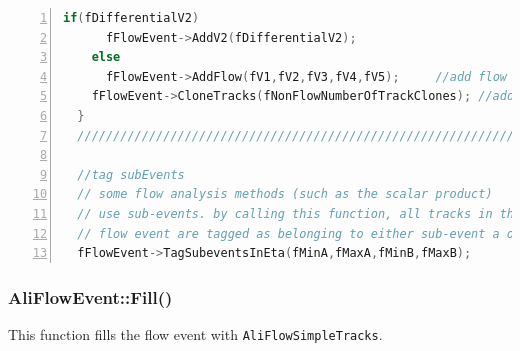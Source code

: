\documentclass[a4paper]{book}
\numberwithin{equation}{subsection}
\begin{document}
\begin{lstlisting}[language=C, numbers=left]
    if(fDifferentialV2)
      fFlowEvent->AddV2(fDifferentialV2);
    else 
      fFlowEvent->AddFlow(fV1,fV2,fV3,fV4,fV5);     //add flow
    fFlowEvent->CloneTracks(fNonFlowNumberOfTrackClones); //add nonflow by cloning tracks
  }
  //////////////////////////////////////////////////////////////////////////////

  //tag subEvents
  // some flow analysis methods (such as the scalar product) 
  // use sub-events. by calling this function, all tracks in the 
  // flow event are tagged as belonging to either sub-event a or b
  fFlowEvent->TagSubeventsInEta(fMinA,fMaxA,fMinB,fMaxB);\end{lstlisting}

  \subsubsection{AliFlowEvent::Fill()}\label{ref:fill}
This function fills the flow event with \texttt{AliFlowSimpleTracks}.
\end{document}
